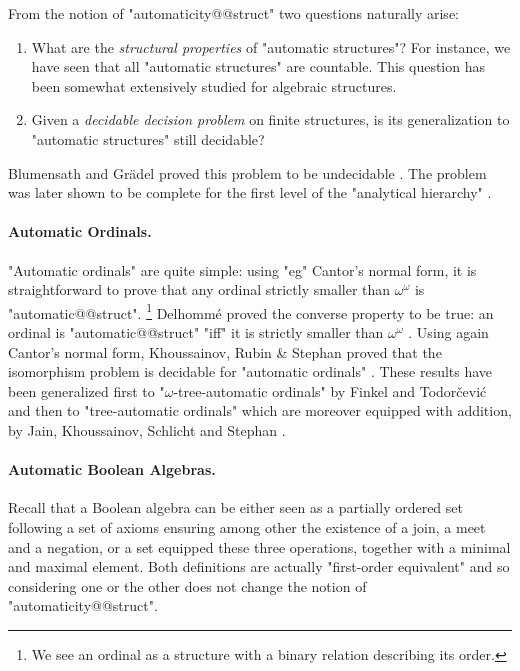 From the notion of "automaticity@@struct" two questions naturally arise:
\begin{enumerate}
	\item What are the \emph{structural properties} of "automatic structures"?
		For instance, we have seen that all "automatic structures" are countable.
		This question has been somewhat extensively studied for algebraic structures.
	\item Given a \emph{decidable decision problem} on finite structures, is its generalization
		to "automatic structures" still decidable?
\end{enumerate}

Blumensath and Grädel proved this problem
to be undecidable \cite[Theorem~5.15]{BlumensathGradel2004FinitePresentations}.
The problem was later shown to be complete for the first level
of the "analytical hierarchy" \cite[Theorem~5.9]{KhoussainovNiesRubinStephan2007Automatic}.

\paragraph*{Automatic Ordinals.}
"Automatic ordinals" are quite simple: using "eg" Cantor's normal form, it is straightforward
to prove that any ordinal strictly smaller than $\omega^\omega$ is "automatic@@struct".%
\footnote{We see an ordinal as a structure with a binary relation describing its order.}
Delhommé proved the converse property to be true:
an ordinal is "automatic@@struct" "iff" it is strictly smaller than $\omega^\omega$
\cite[Corollaire~2.2]{Delhommé2004AutomaticitéOrdinaux}.
Using again Cantor's normal form,
Khoussainov, Rubin \& Stephan proved that the isomorphism problem is decidable for
"automatic ordinals" \cite[Theorem~5.3]{KhoussainovRubinStephan2005AutomaticLinearOrders}.
These results have been generalized first to "$\omega$-tree-automatic ordinals"
by Finkel and Todor\v{c}ević \cite{FinkelTodorcevic2013AutomaticOrdinals}
and then to "tree-automatic ordinals" which
are moreover equipped with addition, by Jain, Khoussainov, Schlicht and Stephan
\cite{JainKhoussainovSchlichtStephan2019IsomorphismTreeAutomaticOrdinals}.

\paragraph*{Automatic Boolean Algebras.}
Recall that a Boolean algebra can be either seen as a partially ordered set
following a set of axioms ensuring among other the existence of a join, a meet
and a negation, or a set equipped these three operations, together with a minimal and maximal 
element. Both definitions are actually "first-order equivalent" and so considering one
or the other does not change the notion of "automaticity@@struct".


